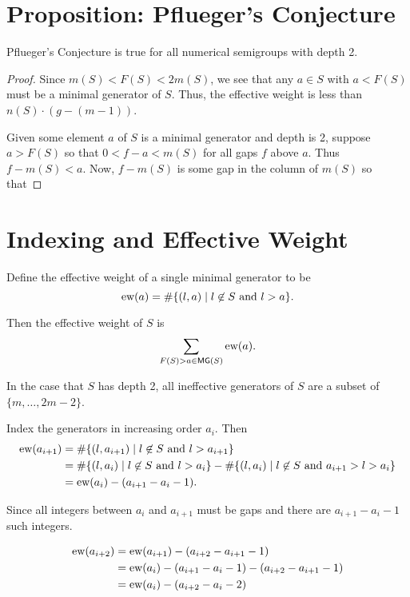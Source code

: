 \documentclass[11pt]{article}
\begin{document}
\section{Proposition: Pflueger's Conjecture}
\begin{proposition}
Pflueger's Conjecture is true for all numerical semigroups with depth 2.
\end{proposition}

\begin{proof}
Since \(m(S) < F(S) < 2m(S)\), we see that any \(a \in S\) with \(a < F(S)\) must be a minimal generator of \(S\). Thus, the effective weight is less than \(n(S) \cdot (g - (m - 1))\).

Given some element \(a\) of \(S\) is a minimal generator and depth is 2, suppose \(a > F(S)\) so that \(0 < f - a < m(S)\) for all gaps \(f\) above \(a\). Thus \(f - m(S) < a\). Now, \(f - m(S)\) is some gap in the column of \(m(S)\) so that 
\end{proof}

\section{Indexing and Effective Weight}
Define the effective weight of a single minimal generator to be 
\[
\text{ew}(a) = \#\{(l, a) \mid l \not\in S \text{ and } l > a\}.
\]

Then the effective weight of \(S\) is 
\[
\sum\limits_{F(S) > a \in \mathsf{MG}(S)} \text{ew}(a).
\]

In the case that \(S\) has depth 2, all ineffective generators of \(S\) are a subset of \(\{m, \dots, 2m - 2\}\).

Index the generators in increasing order \(a_i\). Then 
\begin{align*}
\text{ew}(a_{i+1}) &= \#\{(l, a_{i+1}) \mid l \not\in S \text{ and } l > a_{i+1}\} \\
&= \#\{(l, a_{i}) \mid l \not\in S \text{ and } l > a_i\} - \#\{(l, a_{i}) \mid l \not\in S \text{ and } a_{i+1} > l > a_{i}\} \\
&= \text{ew}(a_i) - (a_{i+1} - a_i - 1).
\end{align*}

Since all integers between \(a_i\) and \(a_{i+1}\) must be gaps and there are \(a_{i+1} - a_i - 1\) such integers. 

\begin{align*}
    \text{ew}(a_{i+2}) &= \text{ew}(a_{i+1}) - (a_{i+2} - a_{i+1} - 1) \\
    &= \text{ew}(a_i) - (a_{i+1} - a_i - 1) - (a_{i+2} - a_{i+1} - 1)\\
    &= \text{ew}(a_i) - (a_{i+2} - a_i - 2)
\end{align*}
\end{document}
